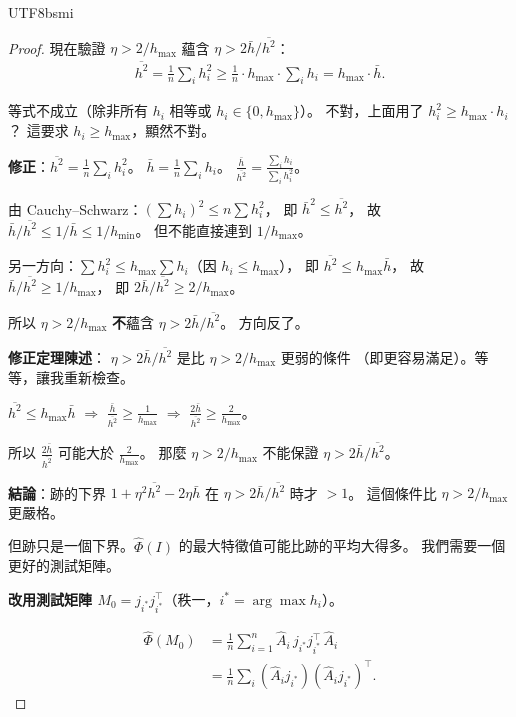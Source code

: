 \documentclass[11pt,a4paper]{article}
\theoremstyle{definition}
\begin{document}
\begin{CJK}{UTF8}{bsmi}
\begin{proof}
  現在驗證 $\eta > 2/h_{\max}$ 蘊含 $\eta > 2\bar{h}/\overline{h^2}$：
  \begin{align*}
    \overline{h^2} = \frac{1}{n}\sum_i h_i^2
    \geq \frac{1}{n}\cdot h_{\max}\cdot\sum_i h_i
    = h_{\max}\cdot\bar{h}.
  \end{align*}

  等式不成立（除非所有 $h_i$ 相等或 $h_i \in \{0, h_{\max}\}$）。
  不對，上面用了 $h_i^2 \geq h_{\max}\cdot h_i$？
  這要求 $h_i \geq h_{\max}$，顯然不對。

  \textbf{修正}：$\overline{h^2} = \frac{1}{n}\sum_i h_i^2$。
  $\bar{h} = \frac{1}{n}\sum_i h_i$。
  $\frac{\bar{h}}{\overline{h^2}} = \frac{\sum_i h_i}{\sum_i h_i^2}$。

  由 Cauchy--Schwarz：$(\sum h_i)^2 \leq n\sum h_i^2$，
  即 $\bar{h}^2 \leq \overline{h^2}$，
  故 $\bar{h}/\overline{h^2} \leq 1/\bar{h} \leq 1/h_{\min}$。
  但不能直接連到 $1/h_{\max}$。

  另一方向：$\sum h_i^2 \leq h_{\max}\sum h_i$（因 $h_i \leq h_{\max}$），
  即 $\overline{h^2} \leq h_{\max}\bar{h}$，
  故 $\bar{h}/\overline{h^2} \geq 1/h_{\max}$，
  即 $2\bar{h}/\overline{h^2} \geq 2/h_{\max}$。

  所以 $\eta > 2/h_{\max}$ \textbf{不}蘊含 $\eta > 2\bar{h}/\overline{h^2}$。
  方向反了。

  \textbf{修正定理陳述}：
  $\eta > 2\bar{h}/\overline{h^2}$ 是比 $\eta > 2/h_{\max}$ 更弱的條件
  （即更容易滿足）。等等，讓我重新檢查。

  $\overline{h^2} \leq h_{\max}\bar{h}$ $\Rightarrow$
  $\frac{\bar{h}}{\overline{h^2}} \geq \frac{1}{h_{\max}}$ $\Rightarrow$
  $\frac{2\bar{h}}{\overline{h^2}} \geq \frac{2}{h_{\max}}$。

  所以 $\frac{2\bar{h}}{\overline{h^2}}$ 可能大於 $\frac{2}{h_{\max}}$。
  那麼 $\eta > 2/h_{\max}$ 不能保證 $\eta > 2\bar{h}/\overline{h^2}$。

  \textbf{結論}：跡的下界 $1 + \eta^2\overline{h^2} - 2\eta\bar{h}$
  在 $\eta > 2\bar{h}/\overline{h^2}$ 時才 $> 1$。
  這個條件比 $\eta > 2/h_{\max}$ 更嚴格。

  但跡只是一個下界。$\hat\Phi(I)$ 的最大特徵值可能比跡的平均大得多。
  我們需要一個更好的測試矩陣。

  \medskip
  \textbf{改用測試矩陣 $M_0 = j_{i^*}j_{i^*}^\top$}（秩一，$i^* = \arg\max h_i$）。

  \begin{align*}
    \hat\Phi(M_0)
    &= \frac{1}{n}\sum_{i=1}^n \hat{A}_i\,j_{i^*}j_{i^*}^\top\,\hat{A}_i\\
    &= \frac{1}{n}\sum_i (\hat{A}_i j_{i^*})(\hat{A}_i j_{i^*})^\top.
  \end{align*}


\end{proof}
\end{CJK}
\end{document}
